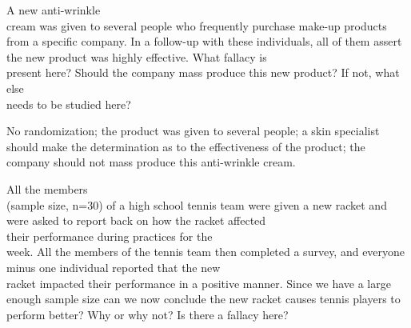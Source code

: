 \documentclass[11pt]{book}\usepackage[]{graphicx}\usepackage[]{color}
\begin{document}
\begin{exercises}
\begin{exercise}

  \end{exercise}

\begin{exercise}  %

A new anti-wrinkle \\ cream was given to several people who frequently purchase make-up products from a specific  company.  In a follow-up with these individuals, all of them assert the new product was highly effective.  What fallacy is \\ present here?  Should the company mass produce this new product? If not, what else \\ needs to be studied here?

\end{exercise}
\begin{solution}  %

No randomization; the product was given to several people; a skin specialist should make the determination as to the effectiveness of the product; the company should not mass produce this anti-wrinkle cream.

\end{solution}

\begin{exercise}  %

All the members \\ (sample  size, n=30) of a high school tennis team were given a new racket and were asked to report back on how the racket affected \\ their performance during practices for the \\ week.  All the members of the tennis team then completed a survey, and everyone minus one individual reported that the new \\ racket impacted their performance in a positive manner.  Since we have a large enough sample size can we now conclude the new racket causes tennis players to perform better?  Why or why not?  Is there a fallacy here?

	\end{exercise}


\end{exercises}
\end{document}
